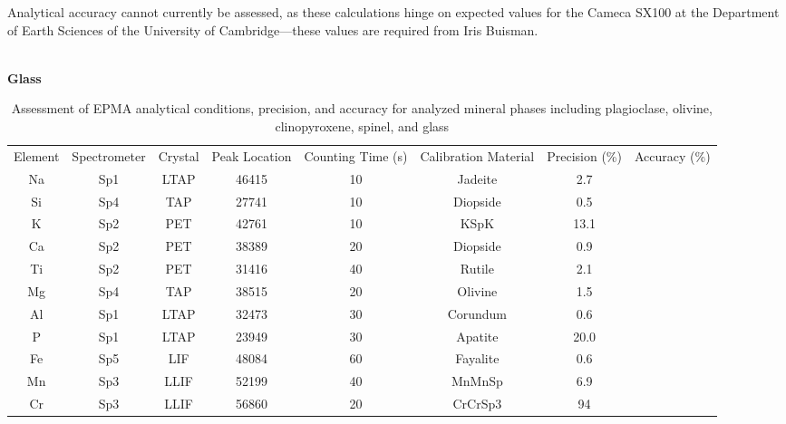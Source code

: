 Analytical accuracy cannot currently be assessed, as these calculations hinge on expected values for the Cameca SX100 at the Department of Earth Sciences of the University of Cambridge—these values are required from Iris Buisman. 
\\ 
\\ 
\begin{table}[!htbp]
\caption[EPMA analytical conditions, precision, and accuracy]{Assessment of EPMA analytical conditions, precision, and accuracy for analyzed mineral phases including plagioclase, olivine, clinopyroxene, spinel, and glass}
\label{table:EPMAConditions}

\begin{subtable}[h]{1\textwidth}
\centering
\textbf{Glass} \\ 
\vspace{5pt}
\begin{adjustbox}{width=1\textwidth, center=\textwidth}
\begin{tabular}{c c c c c c c c}
\hline 
\multirow{3}{*}{Element} & \multirow{3}{*}{Spectrometer} & \multirow{3}{*}{Crystal} & \multirow{3}{*}{Peak Location} & \multirow{3}{2cm}{\centering Counting Time (s)}  & \multirow{3}{2cm}{\centering Calibration Material} & \multirow{3}{*}{Precision (\%)} & \multirow{3}{*}{Accuracy (\%)}\\ 
\\ 
\\
\hline
Na & Sp1 & LTAP & 46415 & 10 & Jadeite & 2.7 &  \\
Si & Sp4 & TAP & 27741 & 10 & Diopside & 0.5 &  \\
K & Sp2 & PET & 42761 & 10 & KSpK & 13.1 &  \\
Ca & Sp2 & PET & 38389 & 20 & Diopside & 0.9 &  \\
Ti & Sp2 & PET & 31416 & 40 & Rutile & 2.1 &  \\
Mg & Sp4 & TAP & 38515 & 20 & Olivine & 1.5 &  \\
Al & Sp1 & LTAP & 32473 & 30 & Corundum & 0.6 &  \\
P & Sp1 & LTAP & 23949 & 30 & Apatite & 20.0 &  \\
Fe & Sp5 & LIF & 48084 & 60 & Fayalite & 0.6 &  \\
Mn & Sp3 & LLIF & 52199 & 40 & MnMnSp & 6.9 &  \\
Cr & Sp3 & LLIF & 56860 & 20 & CrCrSp3 & 94 &  \\
\hline 
\end{tabular}
\end{adjustbox}
\vspace{3pt}
\end{subtable}
\end{table}



